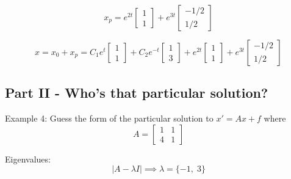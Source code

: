 \documentclass[12pt]{article}
\begin{document}
\[x_p = e^{2t}\begin{bmatrix}
    1\\1
\end{bmatrix} + e^{3t} \begin{bmatrix}
    -1/2\\
    1/2
\end{bmatrix}\]

\[\boxed{x = x_0 + x_p = C_1 e^t \begin{bmatrix}
    1\\1
\end{bmatrix} + C_2 e^{-t} \begin{bmatrix}
    1\\3
\end{bmatrix} + e^{2t} \begin{bmatrix}
    1\\1
\end{bmatrix} + e^{3t} \begin{bmatrix}
    -1/2\\
    1/2
\end{bmatrix}}\]

\subsection*{Part II - Who's that particular solution?}
Example 4: Guess the form of the particular solution to $x' = Ax + f$ where 
\[A = \begin{bmatrix}
    1 & 1\\
    4 & 1
\end{bmatrix}\]

Eigenvalues:
\[|A - \lambda I| \implies \lambda = \{-1, \; 3\}\]
\end{document}
